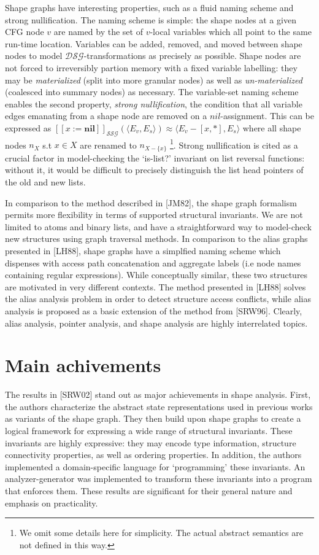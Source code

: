 \documentclass{article}
\begin{document}
Shape graphs have interesting properties, such as a fluid naming scheme and
strong nullification. The naming scheme is simple: the shape nodes at a
given CFG node $v$ are named by the set of $v$-local variables which all
point to the same run-time location.  Variables can be added, removed, and
moved between shape nodes to model $\mathcal{DSG}$-transformations as
precisely as possible. Shape nodes are not forced to irreversibly partion
memory with a fixed variable labelling: they may be \textit{materialized}
(split into more granular nodes) as well as \textit{un-materialized}
(coalesced into summary nodes) as necessary.  The variable-set naming scheme
enables the second property, \textit{strong nullification}, the condition
that all variable edges emanating from a shape node are removed on a
$nil$-assignment. This can be expressed as $[\![x :=
\textbf{nil}]\!]_{\mathcal{SSG}}(\langle E_v, E_s \rangle) \approx \langle
E_v - [x, *], E_s \rangle$ where all shape nodes $n_X$ s.t $x \in X$ are
renamed to $n_{X - \{x\}}$ \footnote{We omit some details here for
simplicity. The actual abstract semantics are not defined in this way.}.
Strong nullification is cited as a crucial factor in model-checking the
`is-list?' invariant on list reversal functions: without it, it would be
difficult to precisely distinguish the list head pointers of the old and new
lists.

In comparison to the method described in [JM82], the shape graph formalism
permits more flexibility in terms of supported structural invariants. We are
not limited to atoms and binary lists, and have a straightforward way to
model-check new structures using graph traversal methods. In comparison to
the alias graphs presented in [LH88], shape graphs have a simplfied naming
scheme which dispenses with access path concatenation and aggregate labels
(i.e node names containing regular expressions). While conceptually similar,
these two structures are motivated in very different contexts. The method
presented in [LH88] solves the alias analysis problem in order to detect
structure access conflicts, while alias analysis is proposed as a basic
extension of the method from [SRW96]. Clearly, alias analysis, pointer
analysis, and shape analysis are highly interrelated topics.

\section{Main achivements}

The results in [SRW02] stand out as major achievements in shape analysis.
First, the authors characterize the abstract state representations used in
previous works as variants of the shape graph. They then build upon shape
graphs to create a logical framework for expressing a wide range of
structural invariants.  These invariants are highly expressive: they may
encode type information, structure connectivity properties, as well as
ordering properties. In addition, the authors implemented a domain-specific
language for `programming' these invariants. An analyzer-generator was
implemented to transform these invariants into a program that enforces them.
These results are significant for their general nature and emphasis on
practicality.
\end{document}
